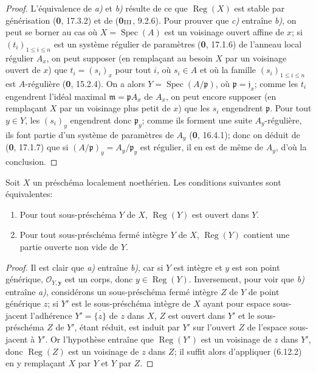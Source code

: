 \begin{proof}
L'équivalence de \emph{a)} et \emph{b)} résulte de ce que $\operatorname{Reg}(X)$ est
stable par générisation (\textbf{0}, 17.3.2) et de (\textbf{0}$_{\rm III}$, 9.2.6). Pour
prouver que \emph{c)} entraîne \emph{b)}, on peut se borner au cas où
$X=\operatorname{Spec}(A)$ est un voisinage ouvert affine de $x$; si
$(t_i)_{1\leq i\leq n}$ est un système régulier de paramètres (\textbf{0}, 17.1.6)
de l'anneau local régulier $A_x$, on peut supposer (en remplaçant au besoin
$X$ par un voisinage ouvert de $x$) que $t_i=(s_i)_x$ pour tout $i$, où
$s_i\in A$ et où la famille $(s_i)_{1\leq i\leq n}$ est $A$-régulière
(\textbf{0}, 15.2.4). On a alors $Y=\operatorname{Spec}(A/\mathfrak p)$, où
$\mathfrak p=\mathfrak j_x$; comme les $t_i$ engendrent l'idéal maximal
$\mathfrak m=\mathfrak pA_x$ de $A_x$, on peut encore supposer (en
remplaçant $X$ par un voisinage plus petit de $x$) que les $s_i$ engendrent
$\mathfrak p$. Pour tout $y\in Y$, les $(s_i)_y$ engendrent donc
$\mathfrak p_y$; comme ils forment une suite $A_y$-régulière, ils font
partie d'un système de paramètres de $A_y$ (\textbf{0}, 16.4.1); donc on déduit de
(\textbf{0}, 17.1.7) que si $(A/\mathfrak p)_y=A_y/\mathfrak p_y$ est régulier, il
en est de même de $A_y$, d'où la conclusion.
\end{proof}

\begin{corollary}[6.12.3]
\label{IV.2.s6.12.3-fr}
Soit $X$ un préschéma localement noethérien. Les conditions suivantes sont
équivalentes:
\begin{enumerate}
\item[\textup{a)}] Pour tout sous-préschéma $Y$ de $X$,
$\operatorname{Reg}(Y)$ est ouvert dans $Y$.


\item[\textup{b)}] Pour tout sous-préschéma fermé intègre $Y$ de $X$,
$\operatorname{Reg}(Y)$ contient une partie ouverte non vide de $Y$.
\end{enumerate}
\end{corollary}

\begin{proof}
Il est clair que \emph{a)} entraîne \emph{b)}, car si $Y$ est intègre et $y$ est son point
générique, $\mathcal O_{Y,\boldsymbol{y}}$ est un corps, donc $y\in\operatorname{Reg}(Y)$.
Inversement, pour voir que \emph{b)} entraîne \emph{a)}, considérons un sous-préschéma
fermé intègre $Z$ de $Y$ de point générique $z$; si $Y'$ est le
sous-préschéma intègre de $X$ ayant pour espace sous-jacent l'adhérence
$Y'=\overline{\{z\}}$ de $z$ dans $X$, $Z$ est ouvert dans $Y'$ et le
sous-préschéma $Z$ de $Y'$, étant réduit, est induit par $Y'$ sur l'ouvert
$Z$ de l'espace sous-jacent à $Y'$. Or l'hypothèse entraîne que
$\operatorname{Reg}(Y')$ est un voisinage de $z$ dans $Y'$, donc
$\operatorname{Reg}(Z)$ est un voisinage de $z$ dans $Z$; il suffit alors
d'appliquer (6.12.2) en y remplaçant $X$ par $Y$ et $Y$ par $Z$.
\end{proof}

